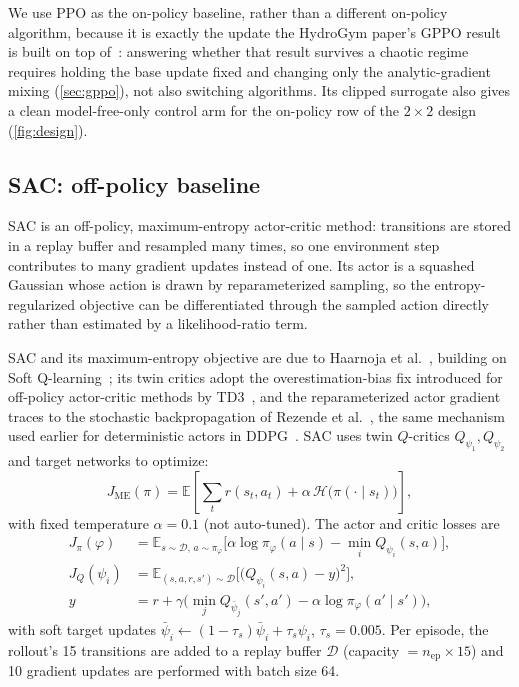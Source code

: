 We use PPO as the on-policy baseline, rather than a
different on-policy algorithm, because it is exactly the update the
HydroGym paper's GPPO result is built on top of~\cite{hydrogym2026}:
answering whether that result survives a chaotic regime requires holding
the base update fixed and changing only the analytic-gradient mixing
(\cref{sec:gppo}), not also switching algorithms. Its clipped surrogate also
gives a clean model-free-only control arm for the on-policy row of the
$2\times 2$ design (\cref{fig:design}).

\subsection{SAC: off-policy baseline}
\label{sec:sac}

SAC is an off-policy, maximum-entropy actor-critic method: transitions are
stored in a replay buffer and resampled many times, so one environment step
contributes to many gradient updates instead of one. Its actor is a
squashed Gaussian whose action is drawn by reparameterized sampling, so the
entropy-regularized objective can be differentiated through the sampled
action directly rather than estimated by a likelihood-ratio term.

SAC and its maximum-entropy objective are due to Haarnoja et
al.~\cite{sac2018,sacapps2018}, building on Soft
Q-learning~\cite{softq2017}; its twin critics adopt the overestimation-bias
fix introduced for off-policy actor-critic methods by
TD3~\cite{fujimoto2018td3}, and the reparameterized actor gradient traces to
the stochastic backpropagation of Rezende et
al.~\cite{rezende2014stochastic}, the same mechanism used earlier for
deterministic actors in DDPG~\cite{lillicrap2016ddpg}. SAC uses twin
$Q$-critics $Q_{\psi_1},Q_{\psi_2}$ and target networks to optimize:
\begin{equation}
  J_{\mathrm{ME}}(\pi)=\mathbb{E}\!\left[\textstyle\sum_t r(s_t,a_t)+\alpha\,\mathcal{H}\!\big(\pi(\cdot\mid s_t)\big)\right],
  \label{eq:sacobj}
\end{equation}
with fixed temperature $\alpha=0.1$ (not auto-tuned). The actor and critic
losses are
\begin{align}
  J_\pi(\varphi)     &=\mathbb{E}_{s\sim\mathcal{D},\,a\sim\pi_\varphi}\!\big[\alpha\log\pi_\varphi(a\mid s)-\min_i Q_{\psi_i}(s,a)\big],
  \label{eq:sacactor}\\
  J_Q(\psi_i)        &=\mathbb{E}_{(s,a,r,s')\sim\mathcal{D}}\!\Big[\big(Q_{\psi_i}(s,a)-y\big)^2\Big],\\
  y&=r+\gamma\big(\min_j Q_{\bar\psi_j}(s',a')-\alpha\log\pi_\varphi(a'\mid s')\big),
  \label{eq:saccritic}
\end{align}
with soft target updates
$\bar\psi_i\leftarrow(1-\tau_s)\bar\psi_i+\tau_s\psi_i$, $\tau_s=0.005$. Per
episode, the rollout's 15 transitions are added to a replay buffer $\mathcal{D}$
(capacity $=n_{\text{ep}}\times 15$) and 10 gradient updates are performed
with batch size 64.

